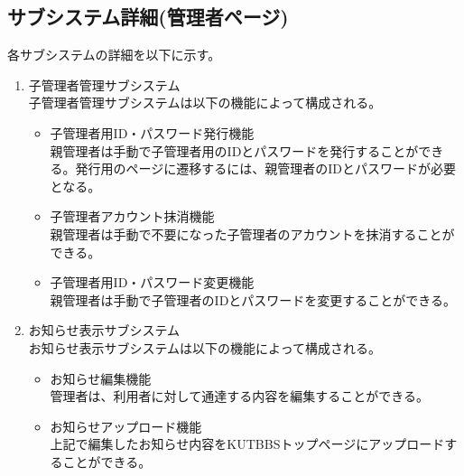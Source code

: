 \documentclass[a4j]{jarticle}
\begin{document}
\subsection{サブシステム詳細(管理者ページ)}
各サブシステムの詳細を以下に示す。
\begin{enumerate}

  \item 子管理者管理サブシステム\\
  子管理者管理サブシステムは以下の機能によって構成される。
  \begin{itemize}
    \item 子管理者用ID・パスワード発行機能\\
    親管理者は手動で子管理者用のIDとパスワードを発行することができる。発行用のページに遷移するには、親管理者のIDとパスワードが必要となる。
    \item 子管理者アカウント抹消機能\\
    親管理者は手動で不要になった子管理者のアカウントを抹消することができる。
    \item 子管理者用ID・パスワード変更機能\\
    親管理者は手動で子管理者のIDとパスワードを変更することができる。\\
  \end{itemize}


  \item お知らせ表示サブシステム\\
  お知らせ表示サブシステムは以下の機能によって構成される。
  \begin{itemize}
    \item お知らせ編集機能\\
    管理者は、利用者に対して通達する内容を編集することができる。
    \item お知らせアップロード機能\\
    上記で編集したお知らせ内容をKUTBBSトップページにアップロードすることができる。\\
  \end{itemize}



\end{enumerate}
\end{document}
